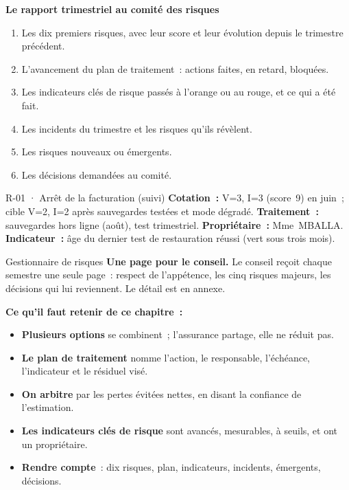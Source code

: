 \begin{boxprocedure}
\textbf{Le rapport trimestriel au comité des risques}
\begin{enumerate}
    \item Les dix premiers risques, avec leur score et leur évolution
          depuis le trimestre précédent.
    \item L'avancement du plan de traitement~: actions faites, en retard,
          bloquées.
    \item Les indicateurs clés de risque passés à l'orange ou au rouge, et
          ce qui a été fait.
    \item Les incidents du trimestre et les risques qu'ils révèlent.
    \item Les risques nouveaux ou émergents.
    \item Les décisions demandées au comité.
\end{enumerate}
\end{boxprocedure}

\begin{boxobjet}{R-01 · Arrêt de la facturation (suivi)}
\textbf{Cotation~:} V=3, I=3 (score~9) en juin~; cible V=2, I=2 après
sauvegardes testées et mode dégradé. \textbf{Traitement~:} sauvegardes hors
ligne (août), test trimestriel. \textbf{Propriétaire~:} Mme~MBALLA.
\textbf{Indicateur~:} âge du dernier test de restauration réussi (vert sous
trois mois).
\end{boxobjet}

\begin{boxmetier}{Gestionnaire de risques}
\textbf{Une page pour le conseil.} Le conseil reçoit chaque semestre une
seule page~: respect de l'appétence, les cinq risques majeurs, les
décisions qui lui reviennent. Le détail est en annexe.
\end{boxmetier}

\separateur

\begin{boxresume}
\textbf{Ce qu'il faut retenir de ce chapitre~:}
\begin{itemize}
    \item \textbf{Plusieurs options} se combinent~; l'assurance partage,
          elle ne réduit pas.
    \item \textbf{Le plan de traitement} nomme l'action, le responsable,
          l'échéance, l'indicateur et le résiduel visé.
    \item \textbf{On arbitre} par les pertes évitées nettes, en disant la
          confiance de l'estimation.
    \item \textbf{Les indicateurs clés de risque} sont avancés, mesurables,
          à seuils, et ont un propriétaire.
    \item \textbf{Rendre compte}~: dix risques, plan, indicateurs,
          incidents, émergents, décisions.
\end{itemize}
\end{boxresume}


